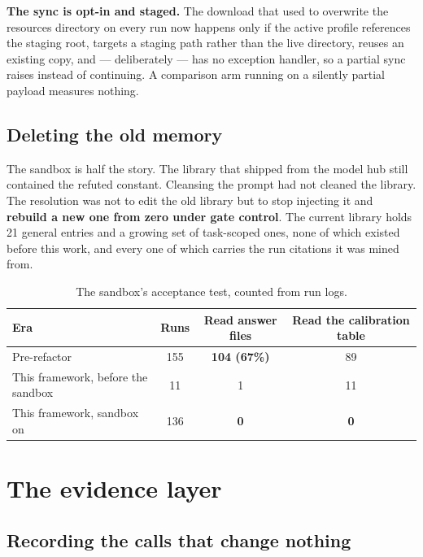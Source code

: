 \documentclass[11pt,a4paper]{report}
\newcommand{\keyrule}[1]{\textbf{\textcolor{acc}{#1}}}
\begin{document}
\keyrule{The sync is opt-in and staged.} The download that used to overwrite the
resources directory on every run now happens only if the active profile
references the staging root, targets a staging path rather than the live
directory, reuses an existing copy, and --- deliberately --- has no exception
handler, so a partial sync raises instead of continuing. A comparison arm
running on a silently partial payload measures nothing.

\section{Deleting the old memory}

The sandbox is half the story. The library that shipped from the model hub still
contained the refuted constant. Cleansing the prompt had not cleaned the
library. The resolution was not to edit the old library but to stop injecting it
and \textbf{rebuild a new one from zero under gate control}. The current library
holds 21 general entries and a growing set of task-scoped ones, none of which
existed before this work, and every one of which carries the run citations it
was mined from.

\begin{table}[htbp]
\centering\small
\begin{tabular}{@{}l c c c@{}}
\toprule
\textbf{Era} & \textbf{Runs} & \textbf{Read answer files} & \textbf{Read the calibration table} \\
\midrule
Pre-refactor & 155 & \textbf{104 (67\%)} & 89 \\
This framework, before the sandbox & 11 & 1 & 11 \\
This framework, sandbox on & 136 & \textbf{0} & \textbf{0} \\
\bottomrule
\end{tabular}
\caption{The sandbox's acceptance test, counted from run logs.}
\end{table}

\chapter{The evidence layer}
\label{ch:evidence}

\section{Recording the calls that change nothing}
\end{document}
